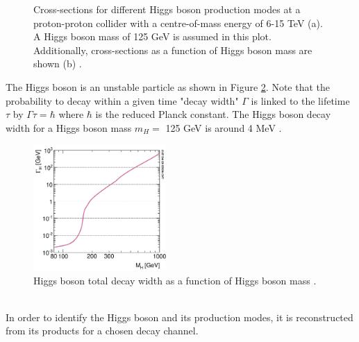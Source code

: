 \begin{figure}[htbp]
    \centering
    \caption{Cross-sections for different Higgs boson production modes at a proton-proton collider with a centre-of-mass energy of 6-15 TeV (a). A Higgs boson mass of 125 GeV is assumed in this plot. Additionally, cross-sections as a function of Higgs boson mass are shown (b) \cite{LHCHXSWG_Twiki}.}
    \label{fig:chap1:EWSB:HXSEC}
\end{figure}
The Higgs boson is an unstable particle as shown in Figure \ref{fig:chap1:EWSB:D}. Note that the probability to decay within a given time "decay width" $\Gamma$ is linked to the lifetime $\tau$ by $ \Gamma\tau = \hbar$ where $\hbar$ is the reduced Planck constant. The Higgs boson decay width for a Higgs boson mass $m_{H} = $ 125 GeV is around 4 MeV \cite{CMS_HiggsWidth}.
\begin{figure}[htbp]
    \centering
    \includegraphics[width=0.45\textwidth]{Ch1/Img/Higgs_decay.png}
    \caption{Higgs boson total decay width as a function of Higgs boson mass \cite{HiggsWidth}.}
    \label{fig:chap1:EWSB:D}
\end{figure}
\\
In order to identify the Higgs boson and its production modes, it is reconstructed from its products for a chosen decay channel. 


